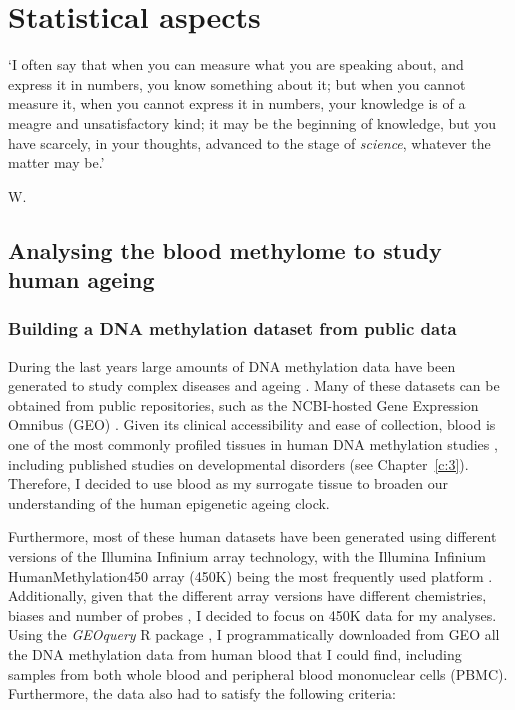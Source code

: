 
\chapter{Statistical aspects}  \label{c:2}

\ifpdf
\graphicspath{{Chapter2/Figs/pdf/}}
\else
\graphicspath{{Chapter2/Figs/svg/}}
\fi

\epigraph{`I often say that when you can measure what you are speaking about, and express it in numbers, you know something about it; but when you cannot measure it, when you cannot express it in numbers, your knowledge is of a meagre and unsatisfactory kind; it may be the beginning of knowledge, but you have scarcely, in your thoughts, advanced to the stage of \textit{science}, whatever the matter may be.'}{W. \citet{Kelvin1889}}

\section{Analysing the blood methylome to study human ageing}

\smallskip

\subsection{Building a DNA methylation dataset from public data}

\smallskip

During the last years large amounts of DNA methylation data have been generated to study complex diseases and ageing \citep{Rakyan2011,Flanagan2015}. Many of these datasets can be obtained from public repositories, such as the NCBI-hosted Gene Expression Omnibus (\acrshort{GEO}) \citep{Edgar2002}. Given its clinical accessibility and ease of collection, blood is one of the most commonly profiled tissues in human DNA methylation studies \citep{Flanagan2015}, including published studies on developmental disorders \citep{Aref-Eshghi2018} (see Chapter~\ref{c:3}). Therefore, I decided to use blood as my surrogate tissue to broaden our understanding of the human epigenetic ageing clock.

\bigskip

Furthermore, most of these human datasets have been generated using different versions of the Illumina Infinium array technology, with the Illumina Infinium HumanMethylation450 array (450K) being the most frequently used platform \citep{Flanagan2015}. Additionally, given that the different array versions have different chemistries, biases and number of probes \citep{Bibikova2009,Bibikova2011,Pidsley2016}, I decided to focus on 450K data for my analyses. Using the \textit{GEOquery} R package \citep{Davis2007}, I programmatically downloaded from GEO all the DNA methylation data from human blood that I could find, including samples from both whole blood and peripheral blood mononuclear cells (\acrshort{PBMC}). Furthermore, the data also had to satisfy the following criteria:

